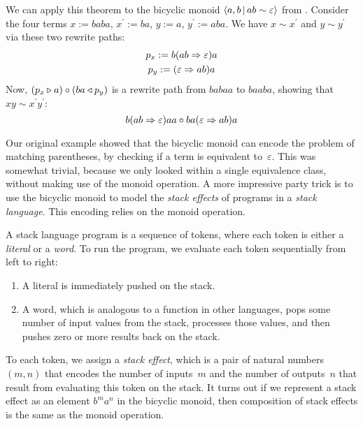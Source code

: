 \documentclass[../generics]{subfiles}
\begin{document}
\begin{example}\label{bicyclic 5}
We can apply this theorem to the bicyclic monoid $\langle a, b\,|\,ab\sim\varepsilon\rangle$ from . Consider the four terms $x := baba$, $x^\prime := ba$, $y := a$, $y^\prime := aba$. We have $x\sim x^\prime$ and $y\sim y^\prime$ via these two rewrite paths:
\begin{gather*}
p_x := b(ab\Rightarrow\varepsilon) a\\
p_y := (\varepsilon\Rightarrow ab) a
\end{gather*}
Now, $(p_x\triangleright a)\circ (ba\triangleleft p_y)$ is a rewrite path from $babaa$ to $baaba$, showing that $xy\sim x^\prime y^\prime$:
\[b(ab\Rightarrow\varepsilon) aa\circ ba(\varepsilon\Rightarrow ab) a\]

Our original example showed that the bicyclic monoid can encode the problem of matching parentheses, by checking if a term is equivalent to~$\varepsilon$. This was somewhat trivial, because we only looked within a single equivalence class, without making use of the monoid operation. A more impressive party trick is to use the bicyclic monoid to model the \emph{stack effects} of programs in a \emph{stack language}. This encoding relies on the monoid operation.

A stack language program is a sequence of tokens, where each token is either a \emph{literal} or a \emph{word}. To run the program, we evaluate each token sequentially from left to right:
\begin{enumerate}
\item A literal is immediately pushed on the stack.
\item A word, which is analogous to a function in other languages, pops some number of input values from the stack, processes those values, and then pushes zero or more results back on the stack.
\end{enumerate}

To each token, we assign a \emph{stack effect}, which is a pair of natural numbers $(m,n)$ that encodes the number of inputs~$m$ and the number of outputs~$n$ that result from evaluating this token on the stack. It turns out if we represent a stack effect as an element $b^m a^n$ in the bicyclic monoid, then composition of stack effects is the same as the monoid operation.


\end{example}
\end{document}
